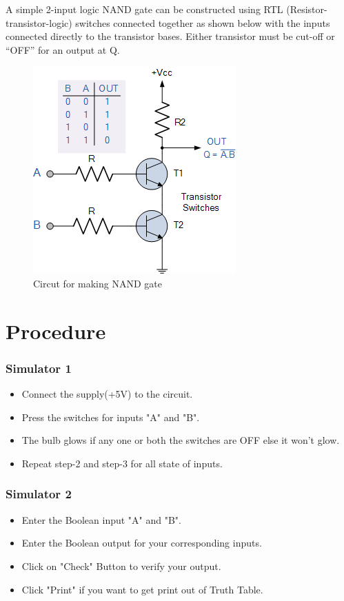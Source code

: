 	A simple 2-input logic NAND gate can be constructed using RTL (Resistor-transistor-logic) switches connected together as shown below with the inputs connected directly to the transistor bases. Either transistor must be cut-off or “OFF” for an output at Q.
	
	\begin{figure}[h]
		\centering
		\includegraphics{img/exp4/3}
		\caption{Circut for making NAND gate}
		\label{fig:4:3}
	\end{figure}
				
\section{Procedure}
	\subsubsection{Simulator 1}
	\begin{itemize}
		\tightlist
		\item Connect the supply(+5V) to the circuit.
		\item Press the switches for inputs "A" and "B".
		\item The bulb glows if any one or both the switches are OFF else it won't glow.
		\item Repeat step-2 and step-3 for all state of inputs.
	\end{itemize}

	\subsubsection{Simulator 2}
	\begin{itemize}
		\tightlist
		\item Enter the Boolean input "A" and "B".
		\item Enter the Boolean output for your corresponding inputs.
		\item Click on "Check" Button to verify your output.
		\item Click "Print" if you want to get print out of Truth Table.
	\end{itemize}


